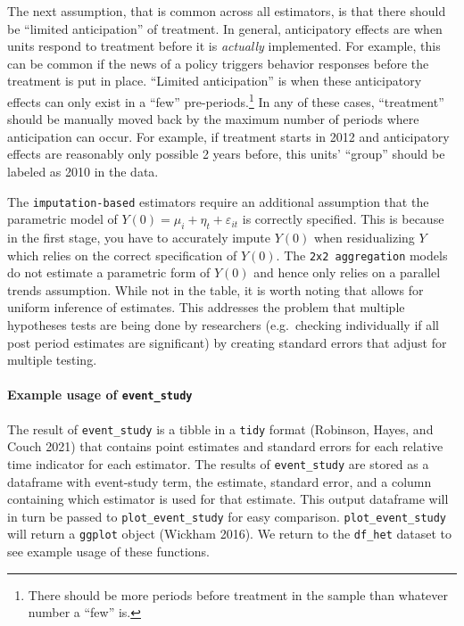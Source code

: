 The next assumption, that is common across all estimators, is that there should be ``limited anticipation'' of treatment. In general, anticipatory effects are when units respond to treatment before it is \emph{actually} implemented. For example, this can be common if the news of a policy triggers behavior responses before the treatment is put in place. ``Limited anticipation'' is when these anticipatory effects can only exist in a ``few'' pre-periods.\footnote{There should be more periods before treatment in the sample than whatever number a ``few'' is.} In any of these cases, ``treatment'' should be manually moved back by the maximum number of periods where anticipation can occur. For example, if treatment starts in 2012 and anticipatory effects are reasonably only possible 2 years before, this units' ``group'' should be labeled as 2010 in the data.

The \texttt{imputation-based} estimators require an additional assumption that the parametric model of \(Y(0) = \mu_i + \eta_t + \varepsilon_{it}\) is correctly specified. This is because in the first stage, you have to accurately impute \(Y(0)\) when residualizing \(Y\) which relies on the correct specification of \(Y(0)\). The \texttt{2x2\ aggregation} models do not estimate a parametric form of \(Y(0)\) and hence only relies on a parallel trends assumption. While not in the table, it is worth noting that  allows for uniform inference of estimates. This addresses the problem that multiple hypotheses tests are being done by researchers (e.g.~checking individually if all post period estimates are significant) by creating standard errors that adjust for multiple testing.

\hypertarget{example-usage-of-event_study}{%
\paragraph{\texorpdfstring{Example usage of \texttt{event\_study}}{Example usage of event\_study}}\label{example-usage-of-event_study}}

The result of \texttt{event\_study} is a tibble in a \texttt{tidy} format (Robinson, Hayes, and Couch 2021) that contains point estimates and standard errors for each relative time indicator for each estimator. The results of \texttt{event\_study} are stored as a dataframe with event-study term, the estimate, standard error, and a column containing which estimator is used for that estimate. This output dataframe will in turn be passed to \texttt{plot\_event\_study} for easy comparison. \texttt{plot\_event\_study} will return a \texttt{ggplot} object (Wickham 2016). We return to the \texttt{df\_het} dataset to see example usage of these functions.

